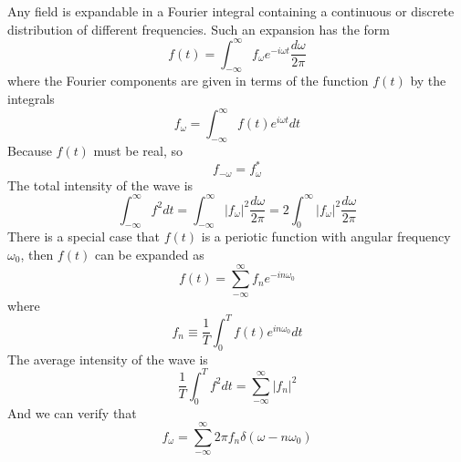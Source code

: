 Any field is expandable in a Fourier integral containing a continuous or discrete distribution of different frequencies. Such an expansion has the form
\[f(t) = \int_{-\infty}^{\infty} f_{\omega}e^{-i\omega t} \frac{d\omega}{2\pi}\]
where the Fourier components are given in terms of the function $f(t)$ by the integrals
\[f_{\omega} = \int_{-\infty}^{\infty} f(t)e^{i\omega t} dt\]
Because $f(t)$ must be real, so
\[f_{-\omega} = f_{\omega}^{*}\]
The total intensity of the wave is
\[\int_{-\infty}^{\infty} f^2 dt = \int_{-\infty}^{\infty} |f_{\omega}|^2 \frac{d\omega}{2\pi} = 2\int_{0}^{\infty} |f_{\omega}|^2 \frac{d\omega}{2\pi} \]
There is a special case that $f(t)$ is a periotic function with angular frequency $\omega_0$, then $f(t)$ can be expanded as
\[f(t) = \sum_{-\infty}^{\infty} f_n e^{-in\omega_0}\]
where
\[f_n \equiv \frac{1}{T} \int_{0}^{T} f(t)e^{in\omega_0} dt\]
The average intensity of the wave is
\[\frac{1}{T}\int_{0}^{T} f^2 dt = \sum_{-\infty}^{\infty} |f_n|^2\]
And we can verify that
\[f_{\omega} = \sum_{-\infty}^{\infty} 2\pi f_n \delta(\omega-n\omega_0)\]

